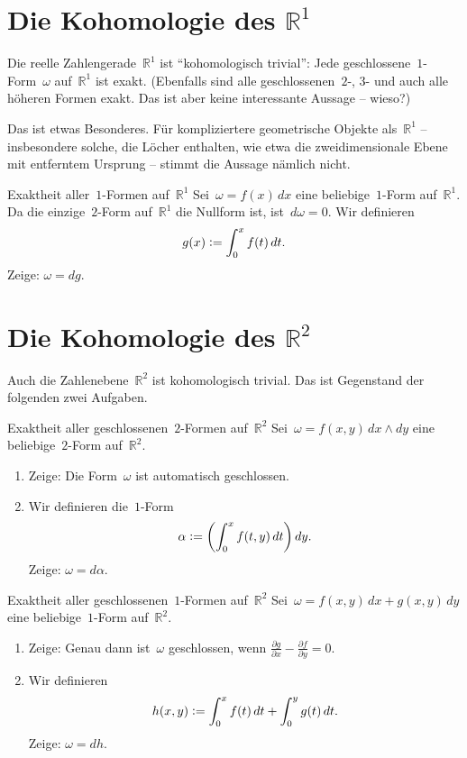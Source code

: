 \documentclass[twoside]{zirkelblatt1415}
\theoremstyle{definition}
\theoremstyle{plain}
\theoremstyle{remark}
\newcommand{\defeq}{\vcentcolon=}
\newcommand{\RR}{\mathbb{R}}
\begin{document}
\section{Die Kohomologie des $\RR^1$}

Die reelle Zahlengerade~$\RR^1$ ist "`kohomologisch trivial"': Jede
geschlossene~$1$-Form~$\omega$ auf~$\RR^1$ ist exakt. (Ebenfalls sind
alle geschlossenen~$2$-, $3$- und auch alle höheren Formen exakt. Das ist aber
keine interessante Aussage -- wieso?)

Das ist etwas Besonderes. Für kompliziertere geometrische Objekte als~$\RR^1$
-- insbesondere solche, die Löcher enthalten, wie etwa die zweidimensionale
Ebene mit entferntem Ursprung -- stimmt die Aussage nämlich nicht.

\begin{aufgabe}{Exaktheit aller~$1$-Formen auf~$\RR^1$}
Sei~$\omega = f(x)\,dx$ eine beliebige~$1$-Form auf~$\RR^1$. Da die
einzige~$2$-Form auf~$\RR^1$ die Nullform ist, ist~$d\omega = 0$. Wir
definieren
\[ g(x) \defeq \int_0^x f(t)\,dt. \]
Zeige: $\omega = dg$.
\end{aufgabe}


\section{Die Kohomologie des $\RR^2$}

Auch die Zahlenebene~$\RR^2$ ist kohomologisch trivial. Das ist Gegenstand der
folgenden zwei Aufgaben.

\begin{aufgabe}{Exaktheit aller geschlossenen~$2$-Formen auf~$\RR^2$}
Sei~$\omega = f(x,y)\,dx \wedge dy$ eine beliebige~$2$-Form auf~$\RR^2$.
\begin{enumerate}
\item Zeige: Die Form~$\omega$ ist automatisch geschlossen.
\item Wir definieren die~$1$-Form
\[ \alpha \defeq \left(\int_0^x f(t,y)\,dt\right) dy. \]
Zeige: $\omega = d\alpha$.
\end{enumerate}
\end{aufgabe}

\begin{aufgabe}{Exaktheit aller geschlossenen~$1$-Formen auf~$\RR^2$}
Sei~$\omega = f(x,y)\,dx + g(x,y)\,dy$ eine beliebige~$1$-Form auf~$\RR^2$.
\begin{enumerate}
\item Zeige: Genau dann ist~$\omega$ geschlossen, wenn
$\frac{\partial g}{\partial x} - \frac{\partial f}{\partial y} = 0$.
\item Wir definieren
\[ h(x,y) \defeq \int_0^x f(t)\,dt + \int_0^y g(t)\,dt. \]
Zeige: $\omega = dh$.
\end{enumerate}
\end{aufgabe}
\end{document}
